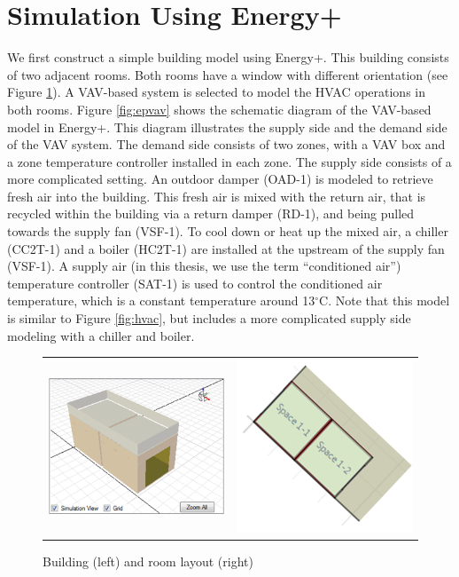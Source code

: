 \section{Simulation Using Energy+} \label{app:ep}

We first construct a simple building model using Energy+. This building consists of two adjacent rooms. Both rooms have a window with different orientation (see Figure \ref{fig:ep}). A VAV-based system is selected to model the HVAC operations in both rooms. Figure \ref{fig:epvav} shows the schematic diagram of the VAV-based model in Energy+. This diagram illustrates the supply side and the demand side of the VAV system. The demand side consists of two zones, with a VAV box and a zone temperature controller installed in each zone. The supply side consists of a more complicated setting. An outdoor damper (OAD-1) is modeled to retrieve fresh air into the building. This fresh air is mixed with the return air, that is recycled within the building via a return damper (RD-1), and being pulled towards the supply fan (VSF-1). To cool down or heat up the mixed air, a chiller (CC2T-1) and a boiler (HC2T-1) are installed at the upstream of the supply fan (VSF-1). A supply air (in this thesis, we use the term ``conditioned air'') temperature controller (SAT-1) is used to control the conditioned air temperature, which is a constant temperature around 13$^\circ$C. Note that this model is similar to Figure \ref{fig:hvac}, but includes a more complicated supply side modeling with a chiller and boiler. 

\begin{figure}[h]
\centering
\begin{tabular}{cc}
\includegraphics[width=2.3in,keepaspectratio]{figs/app_buildings.png} &
\includegraphics[width=2.3in,keepaspectratio]{figs/app_layout.png} \\
\end{tabular}
\caption{Building (left) and room layout (right)}
\label{fig:ep}
\end{figure}


